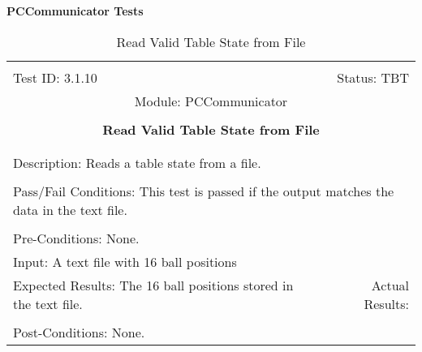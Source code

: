 \documentclass[titlepage]{article}
\begin{document}
\large{\textbf{PCCommunicator Tests}}
\begin{center}%
\begin{table}
\begin{tabular}{|l r|}\hline&\\[-2mm]
	Test ID: 3.1.10	&Status: TBT\\[-3mm]
	\multicolumn{2}{|c|}{Module: PCCommunicator}\\&\\
	\multicolumn{2}{|c|}{\textbf{\large{Read Valid Table State from File}}}\\&\\\hline&\\[-3mm]
	\multicolumn{2}{|p{\textwidth}|}{Description: Reads a table state from a file.}\\[1mm]\hline&\\[-3mm]
	\multicolumn{2}{|p{\textwidth}|}{Pass/Fail Conditions: This test is passed if the output matches the data in the text file.}\\[1mm]\hline&\\[-3mm]
	\multicolumn{2}{|p{\textwidth}|}{Pre-Conditions: None.}\\[4mm]
	\multicolumn{2}{|p{\textwidth}|}{Input: A text file with 16 ball positions}\\[2mm]\hline
	\multicolumn{1}{|p{0.49\textwidth}}{Expected Results: The 16 ball positions stored in the text file.}	&\multicolumn{1}{|p{0.45\textwidth}|}{Actual Results: }\\\hline&\\[-3mm]
	\multicolumn{2}{|p{\textwidth}|}{Post-Conditions: None.}\\\hline
\end{tabular}
\caption{Read Valid Table State from File}
\end{table}
\end{center}
\end{document}
